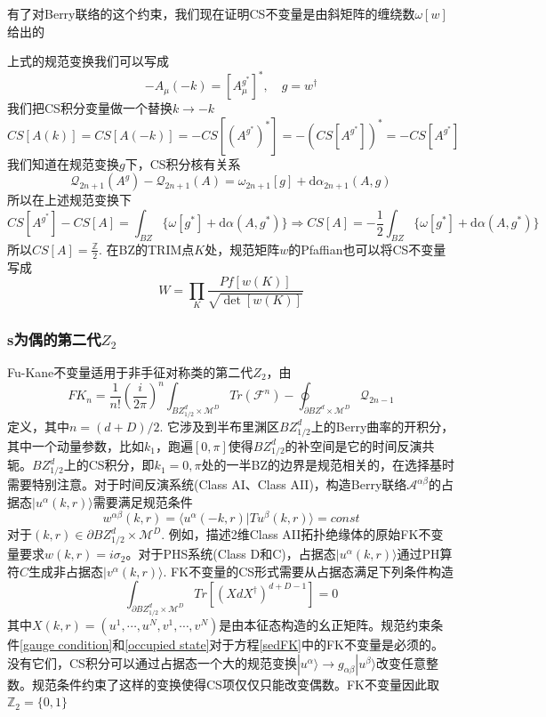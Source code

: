 \documentclass{article}
\numberwithin{equation}{subsection}
\begin{document}
有了对Berry联络的这个约束，我们现在证明CS不变量是由斜矩阵的缠绕数$\omega[w]$给出的

上式的规范变换我们可以写成
\begin{equation}
    -A_\mu(-k)=[A_\mu^{g^*}]^*,\quad g=w^\dagger
\end{equation}
我们把CS积分变量做一个替换$k\rightarrow -k$
\begin{equation}
    CS[A(k)]=CS[A(-k)]=-CS[(A^{g^*})^*]=-(CS[A^{g^*}])^*=-CS[A^{g^*}]
\end{equation}
我们知道在规范变换$g$下，CS积分核有关系
\begin{equation}
    \mathcal{Q}_{2n+1}(A^g)-\mathcal{Q}_{2n+1}(A)=\omega_{2n+1}[g]+\mathrm{d}\alpha_{2n+1}(A,g)
\end{equation}
所以在上述规范变换下
\begin{equation}
    CS[A^{g^*}]-CS[A]=\int_{BZ}\{\omega[g^*]+\mathrm{d}\alpha(A,g^*)\}\Rightarrow CS[A]=-\frac{1}{2}\int_{BZ}\{\omega[g^*]+\mathrm{d}\alpha(A,g^*)\}
\end{equation}
所以$CS[A]=\frac{\mathbb{Z}}{2}$. 在BZ的TRIM点$K$处，规范矩阵$w$的Pfaffian也可以将CS不变量写成
\begin{equation}
    W=\prod_{K}\frac{Pf[w(K)]}{\sqrt{\det[w(K)]}}
\end{equation}
\subsubsection{s为偶的第二代$Z_2$}
Fu-Kane不变量适用于非手征对称类的第二代$Z_2$，由
\begin{equation}\label{sedFK}
    FK_n=\frac{1}{n!}\left(\frac{i}{2\pi}\right)^n\int_{BZ_{1/2}^d\times\mathcal{M}^D}Tr(\mathcal{F}^n)-\oint_{\partial BZ^d\times\mathcal{M}^D}\mathcal{Q}_{2n-1}
\end{equation}
定义，其中$n=(d+D)/2$. 它涉及到半布里渊区$BZ^d_{1/2}$上的Berry曲率的开积分，其中一个动量参数，比如$k_1$，跑遍$[0,\pi]$使得$BZ_{1/2}^d$的补空间是它的时间反演共轭。$BZ_{1/2}^d$上的CS积分，即$k_1=0,\pi$处的一半BZ的边界是规范相关的，在选择基时需要特别注意。对于时间反演系统(Class AI、Class AII)，构造Berry联络$\mathcal{A}^{\alpha\beta}$的占据态$|u^\alpha(k,r)\rangle$需要满足规范条件
\begin{equation}\label{gauge condition}
    w^{\alpha\beta}(k,r)=\langle u^\alpha(-k,r)|Tu^\beta(k,r)\rangle=const
\end{equation}
对于$(k,r)\in\partial BZ_{1/2}^d\times \mathcal{M}^D$. 例如，描述2维Class AII拓扑绝缘体的原始FK不变量要求$w(k,r)=i\sigma_2$。对于PHS系统(Class D和C)，占据态$|u^\alpha(k,r)\rangle$通过PH算符$C$生成非占据态$|v^\alpha(k,r)\rangle$. FK不变量的CS形式需要从占据态满足下列条件构造
\begin{equation}\label{occupied state}
    \int_{\partial BZ_{1/2}^d\times\mathcal{M}^D}Tr[(XdX^\dagger)^{d+D-1}]=0
\end{equation}
其中$X(k,r)=(u^1,\cdots,u^N,v^1,\cdots,v^N)$是由本征态构造的幺正矩阵。规范约束条件\eqref{gauge condition}和\eqref{occupied state}对于方程\eqref{sedFK}中的FK不变量是必须的。没有它们，CS积分可以通过占据态一个大的规范变换$|u^\alpha\rangle\rightarrow g_{\alpha\beta}|u^\beta\rangle$改变任意整数。规范条件约束了这样的变换使得CS项仅仅只能改变偶数。FK不变量因此取$\mathbb{Z}_2=\{0,1\}$
\end{document}
